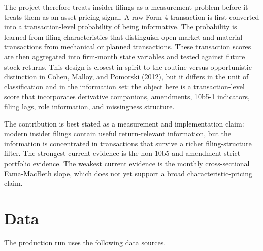 \documentclass[11pt]{article}
\begin{document}
The project therefore treats insider filings as a measurement problem before it
treats them as an asset-pricing signal. A raw Form 4 transaction is first
converted into a transaction-level probability of being informative. The
probability is learned from filing characteristics that distinguish open-market
and material transactions from mechanical or planned transactions. These
transaction scores are then aggregated into firm-month state variables and tested
against future stock returns. This design is closest in spirit to the routine
versus opportunistic distinction in Cohen, Malloy, and Pomorski (2012), but it
differs in the unit of classification and in the information set: the object here
is a transaction-level score that incorporates derivative companions, amendments,
10b5-1 indicators, filing lags, role information, and missingness structure.

The contribution is best stated as a measurement and implementation claim:
modern insider filings contain useful return-relevant information, but the
information is concentrated in transactions that survive a richer filing-structure
filter. The strongest current evidence is the non-10b5 and amendment-strict
portfolio evidence. The weakest current evidence is the monthly cross-sectional
Fama-MacBeth slope, which does not yet support a broad characteristic-pricing
claim.

\section{Data}

The production run uses the following data sources.
\end{document}

